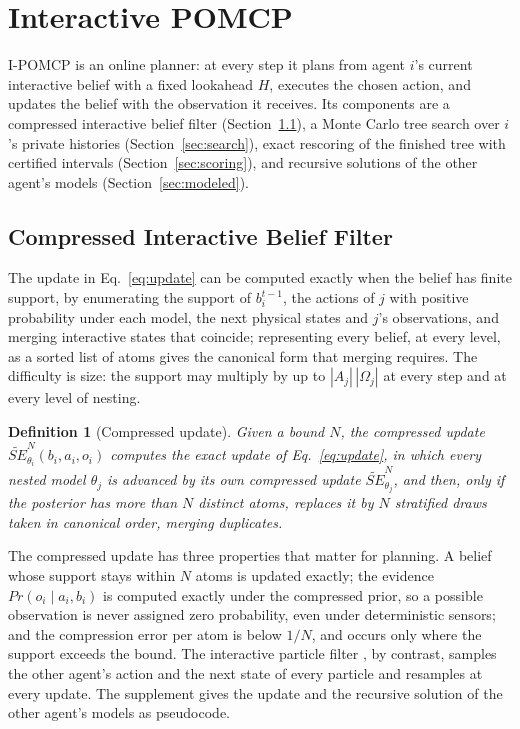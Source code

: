 \documentclass{article}
\newtheorem{definition}{Definition}
\newcommand{\SE}{\mathit{SE}}
\newcommand{\SEN}{\widetilde{\SE}^{N}}
\renewcommand{\Pr}{\mathit{Pr}}
\begin{document}
\section{Interactive POMCP}
\label{sec:method}

I-POMCP is an online planner: at every step it plans from agent $i$'s current interactive belief with a fixed lookahead $H$, executes the chosen action, and updates the belief with the observation it receives. Its components are a compressed interactive belief filter (Section~\ref{sec:filter}), a Monte Carlo tree search over $i$'s private histories (Section~\ref{sec:search}), exact rescoring of the finished tree with certified intervals (Section~\ref{sec:scoring}), and recursive solutions of the other agent's models (Section~\ref{sec:modeled}).


\subsection{Compressed Interactive Belief Filter}
\label{sec:filter}

The update in Eq.~\ref{eq:update} can be computed exactly when the belief has finite support, by enumerating the support of $b_i^{t-1}$, the actions of $j$ with positive probability under each model, the next physical states and $j$'s observations, and merging interactive states that coincide; representing every belief, at every level, as a sorted list of atoms gives the canonical form that merging requires. The difficulty is size: the support may multiply by up to $|A_j|\,|\Omega_j|$ at every step and at every level of nesting.

\begin{definition}[Compressed update]
Given a bound $N$, the compressed update $\SEN_{\theta_i}(b_i, a_i, o_i)$ computes the exact update of Eq.~\ref{eq:update}, in which every nested model $\theta_j$ is advanced by its own compressed update $\SEN_{\theta_j}$, and then, only if the posterior has more than $N$ distinct atoms, replaces it by $N$ stratified draws \cite{douc2005comparison} taken in canonical order, merging duplicates.
\end{definition}

The compressed update has three properties that matter for planning. A belief whose support stays within $N$ atoms is updated exactly; the evidence $\Pr(o_i \mid a_i, b_i)$ is computed exactly under the compressed prior, so a possible observation is never assigned zero probability, even under deterministic sensors; and the compression error per atom is below $1/N$, and occurs only where the support exceeds the bound. The interactive particle filter \cite{doshi2009monte}, by contrast, samples the other agent's action and the next state of every particle and resamples at every update. The supplement gives the update and the recursive solution of the other agent's models as pseudocode.
\end{document}
